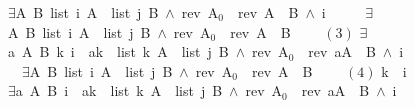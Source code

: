 \documentclass[twoside,runningheads,envcountsame,envcountsect,oribibl,orivec]{llncs}
\begin{document}
\begin{figure}
\begin{isabellebody}
{\isasymlbrakk}{\isacharparenleft}$\exists$A\ B{\isachardot}\ {\isacharparenleft}list\ {\isacharbackquote}i\ A\ {\isacharasterisk}\ list\ {\isacharbackquote}j\ B{\isacharparenright}\ $\wedge$\ {\isacharparenleft}rev\ A$_0${\isacharparenright}\ {\isacharequal}\ {\isacharparenleft}rev\ A{\isacharparenright}\ {\isacharat}\ B{\isacharparenright}\ $\wedge$\ {\isacharbackquote}i\ {\isasymnoteq}\ {}{\isacharcomma}\ \isanewline
\ \ $\exists$A\ B{\isachardot}\ {\isacharparenleft}list\ {\isacharbackquote}i\ A\ {\isacharasterisk}\ list\ {\isacharbackquote}j\ B{\isacharparenright}\ $\wedge$\ {\isacharparenleft}rev\ A$_0${\isacharparenright}\ {\isacharequal}\ {\isacharparenleft}rev\ A{\isacharparenright}\ {\isacharat}\ B\ {\isasymrbrakk}
\isanewline\ \ \ {\isasymsqsubseteq}\hfill $(3)$\isanewline
{\isasymlbrakk}{\isacharparenleft}$\exists$a\ A\ B\ k{\isachardot}\ {\isacharparenleft}{\isacharbackquote}i\ {\isacharbrackleft}{\isasymmapsto}{\isacharbrackright}\ {\isacharbrackleft}a{\isacharcomma}k{\isacharbrackright}\ {\isacharasterisk}\ list\ k\ A\ {\isacharasterisk}\ list\ {\isacharbackquote}j\ B{\isacharparenright}\ $\wedge$\ {\isacharparenleft}rev\ A$_0${\isacharparenright}\ {\isacharequal}\ {\isacharparenleft}rev\ {\isacharparenleft}a{\isacharhash}A{\isacharparenright}{\isacharparenright}\ {\isacharat}\ B{\isacharparenright}\ $\wedge$\ {\isacharbackquote}i\ {\isasymnoteq}\ {}{\isacharcomma}\ \isanewline
\ \ $\exists$A\ B{\isachardot}\ {\isacharparenleft}list\ {\isacharbackquote}i\ A\ {\isacharasterisk}\ list\ {\isacharbackquote}j\ B{\isacharparenright}\ $\wedge$\ {\isacharparenleft}rev\ A$_0${\isacharparenright}\ {\isacharequal}\ {\isacharparenleft}rev\ A{\isacharparenright}\ {\isacharat}\ B\ {\isasymrbrakk}
\isanewline\ \ \ {\isasymsqsubseteq}\hfill $(4)$\isanewline
{\isacharbackquote}k\ {\isacharcolon}{\isacharequal}\ {\isacharat}{\isacharparenleft}{\isacharbackquote}i\ {\isacharplus}\ {}{\isacharparenright}{\isacharsemicolon}\isanewline
{\isasymlbrakk}{\isacharparenleft}$\exists$a\ A\ B{\isachardot}\ {\isacharparenleft}{\isacharbackquote}i\ {\isacharbrackleft}{\isasymmapsto}{\isacharbrackright}\ {\isacharbrackleft}a{\isacharcomma}{\isacharbackquote}k{\isacharbrackright}\ {\isacharasterisk}\ list\ {\isacharbackquote}k\ A\ {\isacharasterisk}\ list\ {\isacharbackquote}j\ B{\isacharparenright}\ $\wedge$\ {\isacharparenleft}rev\ A$_0${\isacharparenright}\ {\isacharequal}\ {\isacharparenleft}rev\ {\isacharparenleft}a{\isacharhash}A{\isacharparenright}{\isacharparenright}\ {\isacharat}\ B{\isacharparenright}\ $\wedge$\ {\isacharbackquote}i\ {\isasymnoteq}\ {}{\isacharcomma}\ \isanewline

\end{isabellebody}
\end{figure}
\end{document}
